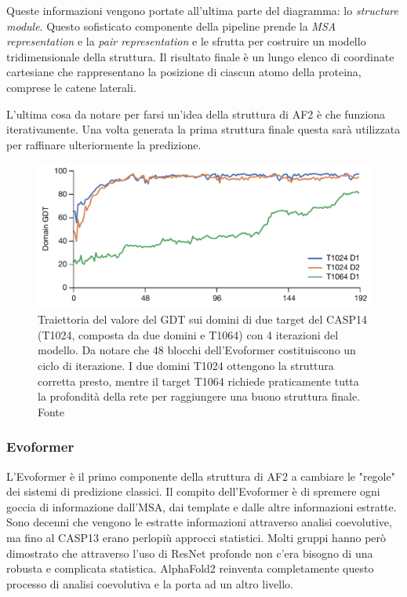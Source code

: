 \par Queste informazioni vengono portate all'ultima parte del diagramma: lo \textit{structure module}. Questo sofisticato componente della pipeline prende la \textit{MSA representation} e la \textit{pair representation} e le sfrutta per costruire un modello tridimensionale della struttura. Il risultato finale è un lungo elenco di coordinate cartesiane che rappresentano la posizione di ciascun atomo della proteina, comprese le catene laterali.

\par L'ultima cosa da notare per farsi un'idea della struttura di AF2 è che funziona iterativamente. Una volta generata la prima struttura finale questa sarà utilizzata per raffinare ulteriormente la predizione.

\begin{figure}[!htb]
	\centering
	\includegraphics[scale=0.4]{images/af2-iterazioni.png}
	\caption{Traiettoria del valore del GDT sui domini di due target del CASP14 (T1024, composta da due domini e T1064) con 4 iterazioni del modello. Da notare che 48 blocchi dell'Evoformer costituiscono un ciclo di iterazione. I due domini T1024 ottengono la struttura corretta presto, mentre il target T1064 richiede praticamente tutta la profondità della rete per raggiungere una buono struttura finale. Fonte\cite{jumper2021highly}}
	\label{fig:af2-iterazioni}
\end{figure}


\subsubsection{Evoformer}
L'Evoformer è il primo componente della struttura di AF2 a cambiare le "regole" dei sistemi di predizione classici. Il compito dell'Evoformer è di spremere ogni goccia di informazione dall'MSA, dai template e dalle altre informazioni estratte. Sono decenni che vengono le estratte informazioni attraverso analisi coevolutive, ma fino al CASP13 erano perlopiù approcci statistici. Molti gruppi hanno però dimostrato che attraverso l'uso di ResNet profonde non c'era bisogno di una robusta e complicata statistica. AlphaFold2 reinventa completamente questo processo di analisi coevolutiva e la porta ad un altro livello.

